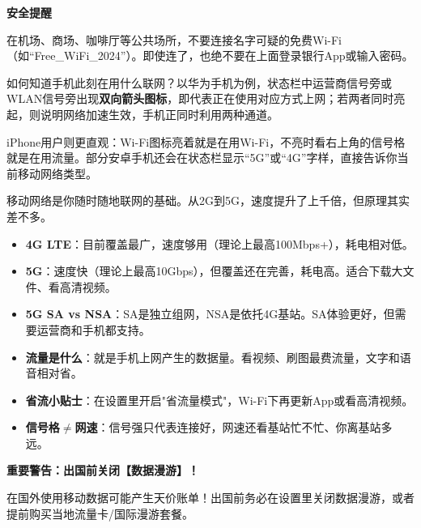 \textbf{安全提醒}\par

在机场、商场、咖啡厅等公共场所，不要连接名字可疑的免费Wi-Fi（如“Free\_WiFi\_2024”）。即使连了，也绝不要在上面登录银行App或输入密码。


如何知道手机此刻在用什么联网？以华为手机为例，状态栏中运营商信号旁或WLAN信号旁出现\textbf{双向箭头图标}，即代表正在使用对应方式上网；若两者同时亮起，则说明网络加速生效，手机正同时利用两种通道。

iPhone用户则更直观：Wi-Fi图标亮着就是在用Wi-Fi，不亮时看右上角的信号格就是在用流量。部分安卓手机还会在状态栏显示“5G”或“4G”字样，直接告诉你当前移动网络类型。


移动网络是你随时随地联网的基础。从2G到5G，速度提升了上千倍，但原理其实差不多。


\begin{itemize}
  \item \textbf{4G LTE}：目前覆盖最广，速度够用（理论上最高100Mbps+），耗电相对低。
  \item \textbf{5G}：速度快（理论上最高10Gbps），但覆盖还在完善，耗电高。适合下载大文件、看高清视频。
  \item \textbf{5G SA vs NSA}：SA是独立组网，NSA是依托4G基站。SA体验更好，但需要运营商和手机都支持。
\end{itemize}


\begin{itemize}
  \item \textbf{流量是什么}：就是手机上网产生的数据量。看视频、刷图最费流量，文字和语音相对省。
  \item \textbf{省流小贴士}：在设置里开启"省流量模式"，Wi-Fi下再更新App或看高清视频。
  \item \textbf{信号格$\neq$网速}：信号强只代表连接好，网速还看基站忙不忙、你离基站多远。
\end{itemize}

\textbf{重要警告：出国前关闭【数据漫游】！}\par

在国外使用移动数据可能产生天价账单！出国前务必在设置里关闭数据漫游，或者提前购买当地流量卡/国际漫游套餐。


